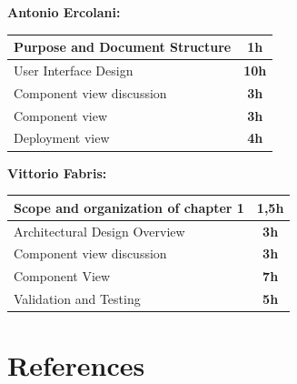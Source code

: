 \documentclass[]{article}
\begin{document}
			\medskip
			\textbf{\large Antonio Ercolani:} \\ \newline
			\begin{tabular}{|l|c|}
				\hline
				Purpose and Document Structure &  \textbf{1h} \\ \hline
				\rowcolor[HTML]{DCDCDC} 
				User Interface Design & \textbf{10h} \\ \hline
				Component view discussion & \textbf{3h} \\ \hline
				\rowcolor[HTML]{DCDCDC} 
				Component view & \textbf{3h} \\ \hline
				Deployment view & \textbf{4h} \\ \hline
				
			\end{tabular}
			\newline
			\newline
			
			\medskip
			\textbf{\large Vittorio Fabris:} \\ \newline
			\begin{tabular}{|l|c|}
				\hline
				Scope and organization of chapter 1&  \textbf{1,5h} \\ \hline
				\rowcolor[HTML]{DCDCDC} 
				 Architectural Design Overview & \textbf{3h} \\ \hline
				 Component view discussion & \textbf{3h} \\ \hline
				\rowcolor[HTML]{DCDCDC} 
				Component View & \textbf{7h} \\ \hline
				Validation and Testing & \textbf{5h} \\ \hline
			\end{tabular}
	
			
			\section{References}	
			
			
	

				
\end{document}
